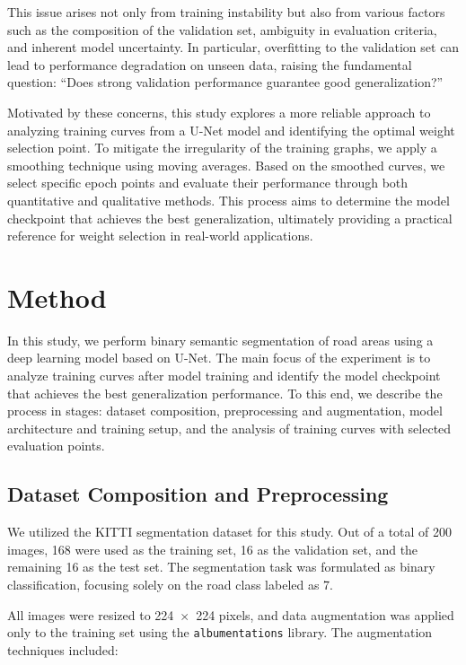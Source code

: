 \documentclass{article}
\begin{document}
This issue arises not only from training instability but also from various factors such as the composition of the validation set, ambiguity in evaluation criteria, and inherent model uncertainty. In particular, overfitting to the validation set can lead to performance degradation on unseen data, raising the fundamental question: “Does strong validation performance guarantee good generalization?”

Motivated by these concerns, this study explores a more reliable approach to analyzing training curves from a U-Net model and identifying the optimal weight selection point. To mitigate the irregularity of the training graphs, we apply a smoothing technique using moving averages. Based on the smoothed curves, we select specific epoch points and evaluate their performance through both quantitative and qualitative methods. This process aims to determine the model checkpoint that achieves the best generalization, ultimately providing a practical reference for weight selection in real-world applications.

\section{Method}
\label{gen_inst}


In this study, we perform binary semantic segmentation of road areas using a deep learning model based on U-Net. The main focus of the experiment is to analyze training curves after model training and identify the model checkpoint that achieves the best generalization performance. To this end, we describe the process in stages: dataset composition, preprocessing and augmentation, model architecture and training setup, and the analysis of training curves with selected evaluation points.


\subsection{Dataset Composition and Preprocessing}


We utilized the {KITTI segmentation dataset} for this study. Out of a total of 200 images, 168 were used as the {training set}, 16 as the {validation set}, and the remaining 16 as the {test set}. The segmentation task was formulated as binary classification, focusing solely on the road class labeled as 7.

All images were resized to {224~$\times$~224 pixels}, and {data augmentation} was applied only to the training set using the \texttt{albumentations} library. The augmentation techniques included:
\end{document}
